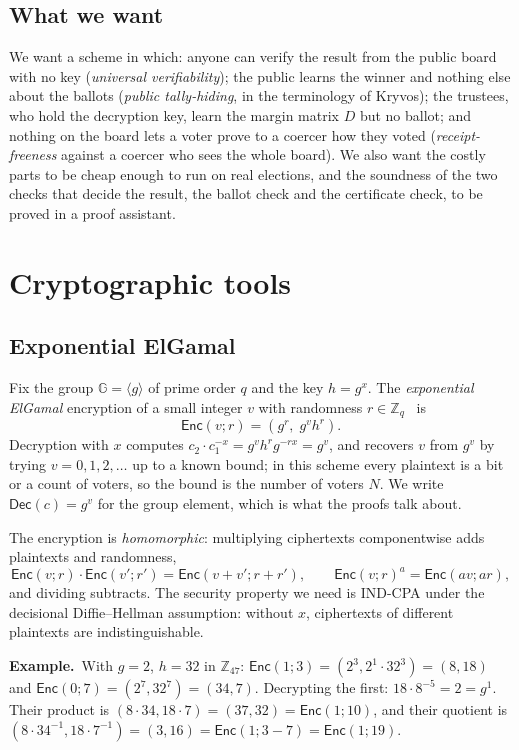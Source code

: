 \documentclass[11pt,a4paper]{article}
\newcommand{\G}{\mathbb{G}}
\newcommand{\Z}{\mathbb{Z}}
\newcommand{\Enc}{\mathsf{Enc}}
\newcommand{\Dec}{\mathsf{Dec}}
\newcommand{\ex}[1]{\par\medskip\noindent\textbf{Example.}~#1\par\medskip}
\theoremstyle{remark}
\begin{document}
\subsection{What we want}
We want a scheme in which: anyone can verify the result from the public
board with no key (\emph{universal verifiability}); the public learns the
winner and nothing else about the ballots (\emph{public tally-hiding}, in
the terminology of Kryvos); the trustees, who hold the decryption key,
learn the margin matrix $D$ but no ballot; and nothing on the board lets a
voter prove to a coercer how they voted (\emph{receipt-freeness} against a
coercer who sees the whole board). We also want the costly parts to be
cheap enough to run on real elections, and the soundness of the two checks
that decide the result, the ballot check and the certificate check, to be
proved in a proof assistant.

\section{Cryptographic tools}\label{sec:tools}

\subsection{Exponential ElGamal}
Fix the group $\G = \langle g \rangle$ of prime order $q$ and the key $h =
g^x$. The \emph{exponential ElGamal} encryption of a small integer $v$ with
randomness $r \in \Z_q$~\cite{elgamal} is
\[
  \Enc(v; r) = (g^r,\; g^v h^r).
\]
Decryption with $x$ computes $c_2 \cdot c_1^{-x} = g^v h^r g^{-rx} = g^v$,
and recovers $v$ from $g^v$ by trying $v = 0, 1, 2, \ldots$ up to a known
bound; in this scheme every plaintext is a bit or a count of voters, so the
bound is the number of voters $N$. We write $\Dec(c) = g^v$ for the group
element, which is what the proofs talk about.

The encryption is \emph{homomorphic}: multiplying ciphertexts componentwise
adds plaintexts and randomness,
\[
  \Enc(v; r) \cdot \Enc(v'; r') = \Enc(v + v'; r + r'),
  \qquad
  \Enc(v; r)^a = \Enc(a v; a r),
\]
and dividing subtracts. The security property we need is IND-CPA under the
decisional Diffie--Hellman assumption: without $x$, ciphertexts of different
plaintexts are indistinguishable.

\ex{With $g = 2$, $h = 32$ in $\Z_{47}$: $\Enc(1; 3) = (2^3, 2^1 \cdot
32^3) = (8, 18)$ and $\Enc(0; 7) = (2^7, 32^7) = (34, 7)$. Decrypting the
first: $18 \cdot 8^{-5} = 2 = g^1$. Their product is $(8 \cdot 34, 18
\cdot 7) = (37, 32) = \Enc(1; 10)$, and their quotient is $(8 \cdot
34^{-1}, 18 \cdot 7^{-1}) = (3, 16) = \Enc(1; 3 - 7) = \Enc(1; 19)$.}
\end{document}
